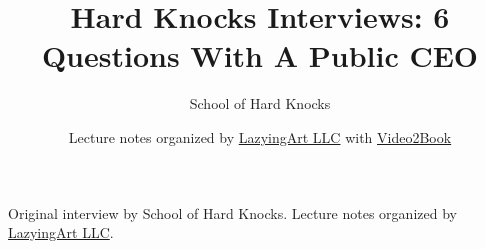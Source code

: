 \documentclass[11pt,oneside]{book}
\begin{document}
\frontmatter
\title{Hard Knocks Interviews: 6 Questions With A Public CEO}
\author{School of Hard Knocks}
\date{Lecture notes organized by \href{https://lazying.art}{LazyingArt LLC} with \href{https://github.com/lachlanchen/Video2Book}{Video2Book}}
\maketitle
\begin{center}
\small Original interview by School of Hard Knocks. Lecture notes organized by \href{https://lazying.art}{LazyingArt LLC}.
\end{center}
\clearpage
\mainmatter

\end{document}
